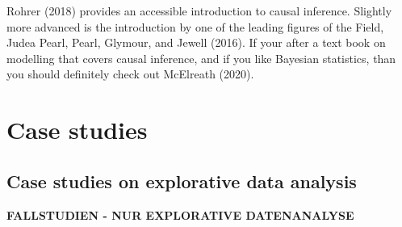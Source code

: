 \documentclass[
  letterpaper,
  DIV=11,
  numbers=noendperiod]{scrreprt}
\theoremstyle{definition}
\theoremstyle{definition}
\theoremstyle{remark}
\begin{document}
Rohrer (2018) provides an accessible introduction to causal inference.
Slightly more advanced is the introduction by one of the leading figures
of the Field, Judea Pearl, Pearl, Glymour, and Jewell (2016). If your
after a text book on modelling that covers causal inference, and if you
like Bayesian statistics, than you should definitely check out McElreath
(2020).


\hypertarget{case-studies}{%
\chapter{Case studies}\label{case-studies}}

\hypertarget{case-studies-on-explorative-data-analysis}{%
\section{Case studies on explorative data
analysis}\label{case-studies-on-explorative-data-analysis}}

\textbf{FALLSTUDIEN - NUR EXPLORATIVE DATENANALYSE}
\end{document}
